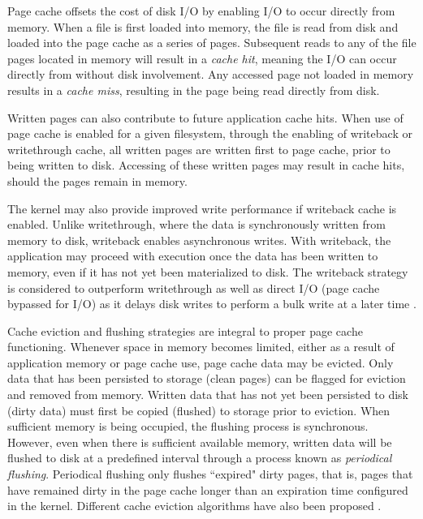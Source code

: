 \documentclass[conference]{IEEEtran}
\begin{document}
        Page cache offsets the cost of disk I/O by enabling I/O to occur directly from memory.
        When a file is first loaded into memory, the file is read from disk and loaded into the page cache as
        a series of pages. Subsequent reads to any of the file pages located in memory will result in
        a \textit{cache hit}, meaning the I/O can occur directly from without disk involvement.
        Any accessed page not loaded in memory results in a \textit{cache miss}, resulting in
        the page being read directly from disk.
        
        Written pages can also contribute to future application cache hits. When use of page cache
        is enabled for a given filesystem, through the enabling of writeback or writethrough cache,
        all written pages are written first to page cache, prior to being written to disk.
        Accessing of these written pages may result in cache hits, should the pages remain in memory.

        The kernel may also provide improved write performance if writeback cache is enabled. Unlike writethrough,
        where the data is synchronously written from memory to disk, writeback enables asynchronous writes.
        With writeback, the application may proceed with execution once the data has been
        written to memory, even if it has not yet been materialized to disk.  
        The writeback strategy is considered to outperform writethrough as well as
        direct I/O (page cache bypassed for I/O) as it delays disk writes to perform a bulk write at a later time
        \cite{linuxdev3rd2010}.

        Cache eviction and flushing strategies are integral to proper page cache functioning.
        Whenever space in memory becomes limited, either as a result of application memory
        or page cache use, page cache data may be evicted. Only data that
        has been persisted to storage (clean pages) can be flagged for eviction and removed from
        memory. Written data that has not yet been persisted to disk (dirty data) must first
        be copied (flushed) to storage prior to eviction. When sufficient memory is
        being occupied, the flushing process is synchronous. However, even when
        there is sufficient available memory, written data will be flushed to disk
        at a predefined interval through a process known as \textit{periodical flushing}.
        Periodical flushing only flushes ``expired" dirty pages, that is, pages that
        have remained dirty in the
        page cache longer than an expiration time configured in the kernel.
        Different cache eviction algorithms have also been proposed
        \cite{owda2014comparison}.
\end{document}
